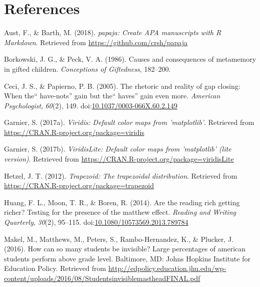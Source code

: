 \documentclass[english,floatsintext,jou]{apa6}
\theoremstyle{definition}
\theoremstyle{definition}
\theoremstyle{definition}
\theoremstyle{remark}
\begin{document}
\newpage

\section{References}\label{references}

\begingroup
\setlength{\parindent}{-0.5in} \setlength{\leftskip}{0.5in}

\hypertarget{refs}{}
\hypertarget{ref-R-papaja}{}
Aust, F., \& Barth, M. (2018). \emph{papaja: Create APA manuscripts with
R Markdown}. Retrieved from \url{https://github.com/crsh/papaja}

\hypertarget{ref-borkowski}{}
Borkowski, J. G., \& Peck, V. A. (1986). Causes and consequences of
metamemory in gifted children. \emph{Conceptions of Giftedness},
182--200.

\hypertarget{ref-ceci}{}
Ceci, J. S., \& Papierno, P. B. (2005). The rhetoric and reality of gap
closing: When the`` have-nots'' gain but the`` haves'' gain even more.
\emph{American Psychologist}, \emph{60}(2), 149.
doi:\href{https://doi.org/10.1037/0003-066X.60.2.149}{10.1037/0003-066X.60.2.149}

\hypertarget{ref-R-viridis}{}
Garnier, S. (2017a). \emph{Viridis: Default color maps from
'matplotlib'}. Retrieved from
\url{https://CRAN.R-project.org/package=viridis}

\hypertarget{ref-R-viridisLite}{}
Garnier, S. (2017b). \emph{ViridisLite: Default color maps from
'matplotlib' (lite version)}. Retrieved from
\url{https://CRAN.R-project.org/package=viridisLite}

\hypertarget{ref-R-trapezoid}{}
Hetzel, J. T. (2012). \emph{Trapezoid: The trapezoidal distribution}.
Retrieved from \url{https://CRAN.R-project.org/package=trapezoid}

\hypertarget{ref-huang}{}
Huang, F. L., Moon, T. R., \& Boren, R. (2014). Are the reading rich
getting richer? Testing for the presence of the matthew effect.
\emph{Reading and Writing Quarterly}, \emph{30}(2), 95--115.
doi:\href{https://doi.org/10.1080/10573569.2013.789784}{10.1080/10573569.2013.789784}

\hypertarget{ref-makel}{}
Makel, M., Matthews, M., Peters, S., Rambo-Hernandez, K., \& Plucker, J.
(2016). How can so many students be invisible? Large percentages of
american students perform above grade level. Baltimore, MD: Johns
Hopkins Institute for Education Policy. Retrieved from
\url{http://edpolicy.education.jhu.edu/wp-content/uploads/2016/08/StudentsinvisiblemastheadFINAL.pdf}
\end{document}
